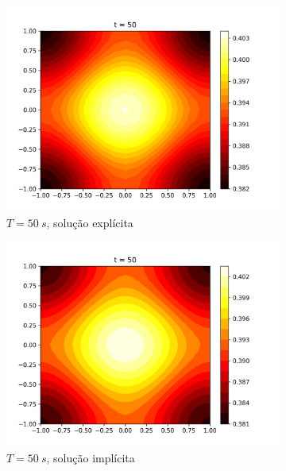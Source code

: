 \documentclass{article}
\begin{document}
\begin{figure}[h]
\begin{subfigure}[b]{0.49\textwidth}
         \centering
         \includegraphics[width=\textwidth]{figs/q7a_heatmap_t50.png}
         \caption{$T=50~s$, solução explícita}
	\label{fig:q7a_heatmap_t50}
     \end{subfigure}
     \hfill
     \begin{subfigure}[b]{0.49\textwidth}
         \centering
     \includegraphics[width=\textwidth]{figs/q7b_heatmap_t50.png}
         \caption{$T=50~s$, solução implícita}
	\label{fig:q7b_heatmap_t50}
     \end{subfigure}
     \begin{subfigure}[b]{0.49\textwidth}
         \centering

\end{subfigure}
\end{figure}
\end{document}
